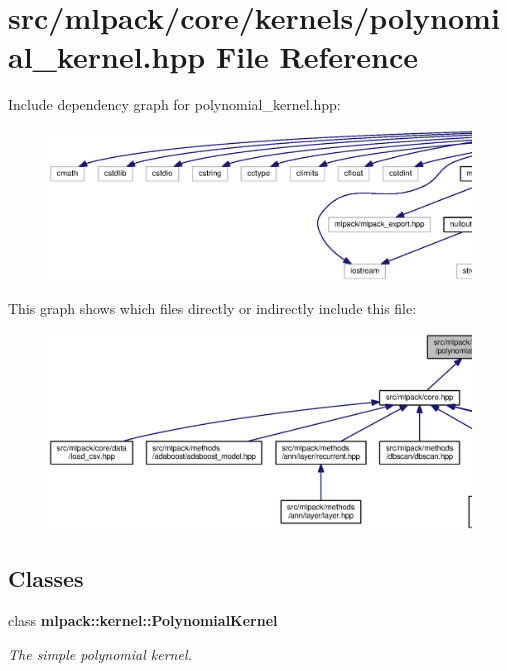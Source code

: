 \section{src/mlpack/core/kernels/polynomial\+\_\+kernel.hpp File Reference}
\label{polynomial__kernel_8hpp}
Include dependency graph for polynomial\+\_\+kernel.\+hpp\+:
\nopagebreak
\begin{figure}[H]
\begin{center}
\leavevmode
\includegraphics[width=350pt]{polynomial__kernel_8hpp__incl}
\end{center}
\end{figure}
This graph shows which files directly or indirectly include this file\+:
\nopagebreak
\begin{figure}[H]
\begin{center}
\leavevmode
\includegraphics[width=350pt]{polynomial__kernel_8hpp__dep__incl}
\end{center}
\end{figure}
\subsection*{Classes}
\begin{DoxyCompactItemize}
\item 
class {\bf mlpack\+::kernel\+::\+Polynomial\+Kernel}
\begin{DoxyCompactList}\small\item\em The simple polynomial kernel. \end{DoxyCompactList}\end{DoxyCompactItemize}
